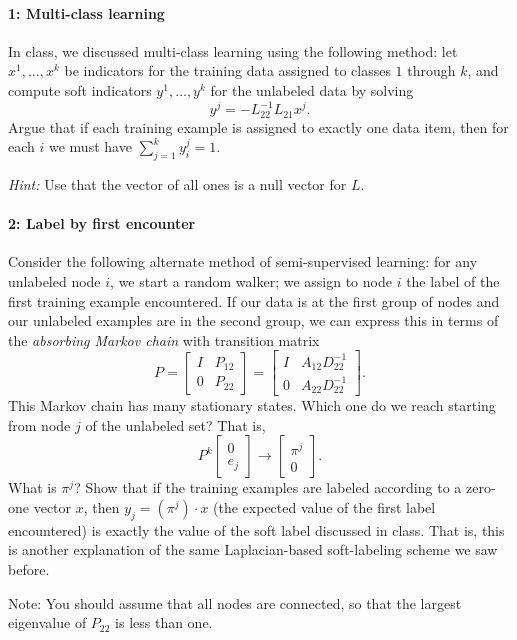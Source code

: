 \documentclass[12pt, leqno]{article} %
\begin{document}

\paragraph*{1: Multi-class learning}
In class, we discussed multi-class learning using the following method:
let $x^1, \ldots, x^k$ be indicators for the training data
assigned to classes $1$ through $k$, and compute soft indicators
$y^1, \ldots, y^k$ for the unlabeled data by solving
\[
  y^j = -L_{22}^{-1} L_{21} x^j.
\]
Argue that if each training example is assigned to exactly one
data item, then for each $i$ we must have $\sum_{j=1}^k y_i^j = 1$.

{\em Hint:} Use that the vector of all ones is a null vector for $L$.

\paragraph*{2: Label by first encounter}
Consider the following alternate method of semi-supervised learning:
for any unlabeled node $i$, we start a random walker; we assign to
node $i$ the label of the first training example encountered.  If our
data is at the first group of nodes and our unlabeled examples are in
the second group, we can express this in terms of the {\em absorbing Markov
chain} with transition matrix
\[
  P =
  \begin{bmatrix} I & P_{12} \\ 0 & P_{22} \end{bmatrix} =
  \begin{bmatrix}
    I & A_{12} D_{22}^{-1} \\
    0 & A_{22} D_{22}^{-1}
  \end{bmatrix}.
\]
This Markov chain has many stationary states.  Which one do we reach
starting from node $j$ of the unlabeled set?  That is,
\[
  P^k \begin{bmatrix} 0 \\ e_j \end{bmatrix} \rightarrow
  \begin{bmatrix} \pi^j \\ 0 \end{bmatrix}.
\]
What is $\pi^j$?  Show that if the training examples are labeled
according to a zero-one vector $x$, then $y_j = (\pi^j) \cdot x$
(the expected value of the first label encountered) is exactly
the value of the soft label discussed in class.  That is, this is
another explanation of the same Laplacian-based soft-labeling scheme
we saw before.

Note: You should assume that all nodes are
connected, so that the largest eigenvalue of $P_{22}$ is less than one.
\end{document}
